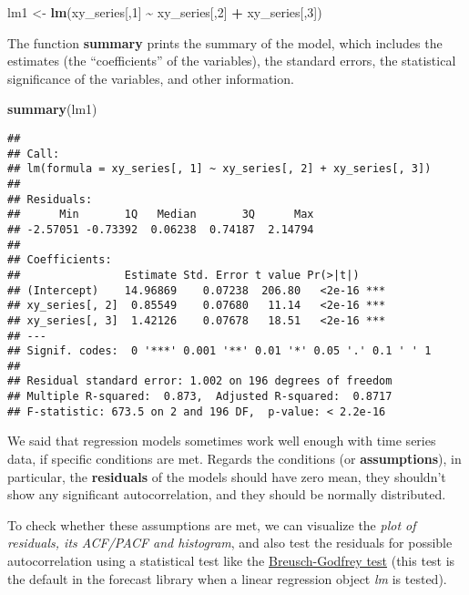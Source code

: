 \documentclass[
]{article}
\newenvironment{Shaded}{\begin{snugshade}}{\end{snugshade}}
\newcommand{\DecValTok}[1]{\textcolor[rgb]{0.00,0.00,0.81}{#1}}
\newcommand{\FunctionTok}[1]{\textcolor[rgb]{0.13,0.29,0.53}{\textbf{#1}}}
\newcommand{\NormalTok}[1]{#1}
\newcommand{\OtherTok}[1]{\textcolor[rgb]{0.56,0.35,0.01}{#1}}
\newcommand{\SpecialCharTok}[1]{\textcolor[rgb]{0.81,0.36,0.00}{\textbf{#1}}}
\begin{document}
\begin{Shaded}
\begin{Highlighting}[]
\NormalTok{lm1 }\OtherTok{\textless{}{-}} \FunctionTok{lm}\NormalTok{(xy\_series[,}\DecValTok{1}\NormalTok{] }\SpecialCharTok{\textasciitilde{}}\NormalTok{ xy\_series[,}\DecValTok{2}\NormalTok{] }\SpecialCharTok{+}\NormalTok{ xy\_series[,}\DecValTok{3}\NormalTok{])}
\end{Highlighting}
\end{Shaded}

The function \textbf{summary} prints the summary of the model, which includes the estimates (the ``coefficients'' of the variables), the standard errors, the statistical significance of the variables, and other information.

\begin{Shaded}
\begin{Highlighting}[]
\FunctionTok{summary}\NormalTok{(lm1)}
\end{Highlighting}
\end{Shaded}

\begin{verbatim}
## 
## Call:
## lm(formula = xy_series[, 1] ~ xy_series[, 2] + xy_series[, 3])
## 
## Residuals:
##      Min       1Q   Median       3Q      Max 
## -2.57051 -0.73392  0.06238  0.74187  2.14794 
## 
## Coefficients:
##                Estimate Std. Error t value Pr(>|t|)    
## (Intercept)    14.96869    0.07238  206.80   <2e-16 ***
## xy_series[, 2]  0.85549    0.07680   11.14   <2e-16 ***
## xy_series[, 3]  1.42126    0.07678   18.51   <2e-16 ***
## ---
## Signif. codes:  0 '***' 0.001 '**' 0.01 '*' 0.05 '.' 0.1 ' ' 1
## 
## Residual standard error: 1.002 on 196 degrees of freedom
## Multiple R-squared:  0.873,  Adjusted R-squared:  0.8717 
## F-statistic: 673.5 on 2 and 196 DF,  p-value: < 2.2e-16
\end{verbatim}

We said that regression models sometimes work well enough with time series data, if specific conditions are met. Regards the conditions (or \textbf{assumptions}), in particular, the \textbf{residuals} of the models should have zero mean, they shouldn't show any significant autocorrelation, and they should be normally distributed.

To check whether these assumptions are met, we can visualize the \emph{plot of residuals, its ACF/PACF and histogram}, and also test the residuals for possible autocorrelation using a statistical test like the \href{https://en.wikipedia.org/wiki/Breusch–Godfrey_test}{Breusch-Godfrey test} (this test is the default in the forecast library when a linear regression object \emph{lm} is tested).
\end{document}
